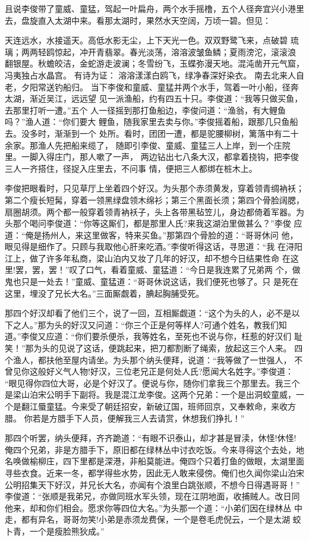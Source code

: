 且说李俊带了童威、童猛，驾起一叶扁舟，两个水手摇橹，五个人径奔宜兴小港里
去，盘旋直入太湖中来。看那太湖时，果然水天空阔，万顷一碧。但见：

天连远水，水接遥天。高低水影无尘，上下天光一色。双双野鹭飞来，点破碧
琉璃；两两轻鸥惊起，冲开青翡翠。春光淡荡，溶溶波皱鱼鳞；夏雨滂沱，滚滚浪
翻银屋。秋蟾皎洁，金蛇游走波澜；冬雪纷飞，玉蝶弥漫天地。混沌凿开元气窟，
冯夷独占水晶宫。
有诗为证：
溶溶漾漾白鸥飞，绿净春深好染衣。
南去北来人自老，夕阳常送钓船归。
当下李俊和童威、童猛并两个水手，驾着一叶小船，径奔太湖，渐近吴江，远远望
见一派渔船，约有四五十只。李俊道：“我等只做买鱼，去那里打听一遭。”五个
人一径摇到那打鱼船边，李俊问道：“渔翁，有大鲤鱼吗？”渔人道：“你们要大
鲤鱼，随我家里去卖与你。”李俊摇着船，跟那几只鱼船去。没多时，渐渐到一个
处所。看时，团团一遭，都是驼腰柳树，篱落中有二十余家。那渔人先把船来缆了，
随即引李俊、童威、童猛三人上岸，到一个庄院里。一脚入得庄门，那人嗽了一声，
两边钻出七八条大汉，都拿着挠钩，把李俊三人一齐搭住，径捉入庄里去，不问事
情，便把三人都绑在桩木上。

李俊把眼看时，只见草厅上坐着四个好汉。为头那个赤须黄发，穿着领青绸衲袄；
第二个瘦长短髯，穿着一领黑绿盘领木绵衫；第三个黑面长须；第四个骨脸阔腮，
扇圈胡须。两个都一般穿着领青衲袄子，头上各带黑毡笠儿，身边都倚着军器。为
头那个喝问李俊道：“你等这厮们，都是那里人氏?来我这湖泊里做甚么？”李俊
应道：“俺是扬州人，来这里做客，特来买鱼。”那第四个骨脸的道：“哥哥休问
他，眼见得是细作了。只顾与我取他心肝来吃酒。”李俊听得这话，寻思道：“我
在浔阳江上，做了许多年私商，梁山泊内又妆了几年的好汉，却不想今日结果性命
在这里!罢，罢，罢！”叹了口气，看着童威、童猛道：“今日是我连累了兄弟两
个，做鬼也只是一处去！”童威、童猛道：“哥哥休说这话，我们便死也够了。只
是死在这里，埋没了兄长大名。”三面厮觑着，腆起胸脯受死。

那四个好汉却看了他们三个，说了一回，互相厮觑道：“这个为头的人，必不是以
下之人。”那为头的好汉又问道：“你三个正是何等样人?可通个姓名，教我们知
道。”李俊又应道：“你们要杀便杀，我等姓名，至死也不说与你，枉惹的好汉们
耻笑！”那为头的见说了这话，便跳起来，把刀都割断了绳索，放起这三个人来。
四个渔人，都扶他至屋内请坐。为头那个纳头便拜，说道：“我等做了一世强人，
不曾见你这般好义气人物!好汉，三位老兄正是何处人氏?愿闻大名姓字。”李俊道：
“眼见得你四位大哥，必是个好汉了。便说与你，随你们拿我三个那里去。我三个
是梁山泊宋公明手下副将。我是混江龙李俊。这两个兄弟：一个是出洞蛟童威，一
个是翻江蜃童猛。今来受了朝廷招安，新破辽国，班师回京，又奉敕命，来收方腊。
你若是方腊手下人员，便解我三人去请赏，休想我们挣扎！”

那四个听罢，纳头便拜，齐齐跪道：“有眼不识泰山，却才甚是冒渎，休怪!休怪!
俺四个兄弟，非是方腊手下，原旧都在绿林丛中讨衣吃饭。今来寻得这个去处，地
名唤做榆柳庄，四下里都是深港，非船莫能进。俺四个只着打鱼的做眼，太湖里面
寻些衣食。近来一冬，都学得些水势，因此无人敢来侵傍。俺们也久闻你梁山泊宋
公明招集天下好汉，并兄长大名，亦闻有个浪里白跳张顺，不想今日得遇哥哥！”
李俊道：“张顺是我弟兄，亦做同班水军头领，现在江阴地面，收捕贼人。改日同
他来，却和你们相会。愿求你等四位大名。”为头那一个道：“小弟们因在绿林丛
中走，都有异名，哥哥勿笑!小弟是赤须龙费保，一个是卷毛虎倪云，一个是太湖
蛟卜青，一个是瘦脸熊狄成。”

